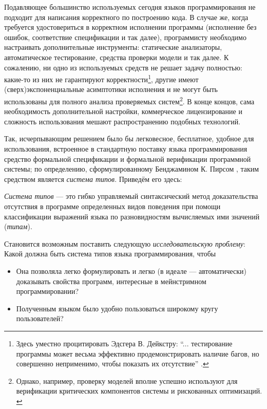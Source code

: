 
Подавляющее большинство используемых сегодня языков
программирования не подходит для написания корректного по
построению кода. В случае же, когда требуется
удостовериться в корректном исполнении программы
(исполнение без ошибок, соответствие спецификации и так
далее), программисту необходимо настраивать дополнительные
инструменты: статические анализаторы, автоматическое
тестирование, средства проверки модели и так далее. К
сожалению, ни одно из используемых средств не решает
задачу полностью: какие-то из них не гарантируют
корректности\footnote{Здесь уместно процитировать Эдсгера
В. Дейкстру: ``... тестирование программы может весьма
эффективно продемонстрировать наличие багов, но совершенно
неприменимо, чтобы показать их отсутствие''
\cite{dijkstra1972humble}.}, другие имеют
(сверх)экспоненциальные асимптотики исполнения и не могут
быть использованы для полного анализа проверяемых
систем\footnote{Однако, например, проверку моделей вполне
успешно используют для верификации критических компонентов
системы и рискованных оптимизаций. \cite{amazon2015}}.
В конце концов, сама необходимость дополнительной
настройки, коммерческое лицензирование и сложность
использования мешают распространению подобных технологий.

Так, исчерпывающим решением было бы легковесное,
бесплатное, удобное для использования, встроенное в
стандартную поставку языка программирования средство
формальной спецификации и формальной верификации
программной системы; по определению, сформулированному
Бенджамином К. Пирсом \cite{пирс2012типы}, таким средством
является \textit{система типов}. Приведём его здесь:

\textit{Система типов} --- это гибко управляемый
синтаксический метод доказательства отсутствия в программе
определенных видов поведения при помощи классификации
выражений языка по разновидностям вычисляемых ими
значений (\textit{типам}).

Становится возможным поставить следующую
\textit{исследовательскую проблему}: \\
Какой должна быть система типов языка программирования,
чтобы
\begin{itemize}
\item Она позволяла легко формулировать и легко (в идеале
--- автоматически) доказывать свойства программ,
интересные в мейнстримном программировании?
\item Полученным языком было удобно пользоваться широкому
кругу пользователей?
\end{itemize}


